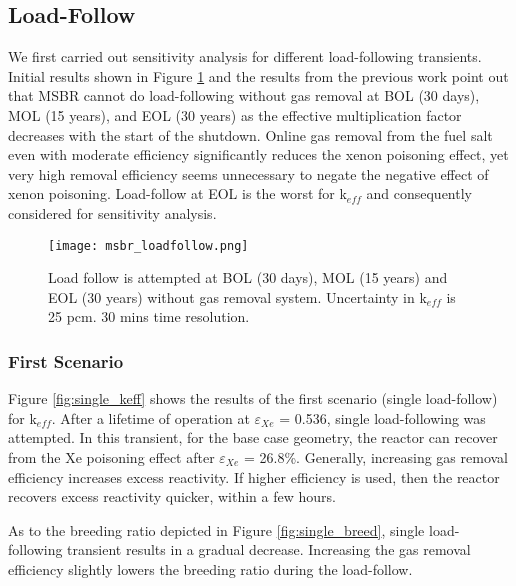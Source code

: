 \subsection{Load-Follow}

    We first carried out sensitivity analysis for different load-following 
    transients. Initial results shown in Figure \ref{fig:loadfollow} and the 
    results from the previous work \cite{rykhlevskii_fuel_2020} point out that 
    \gls{MSBR} cannot do load-following without gas removal at BOL (30 days), MOL (15 
    years), and EOL (30 years) as the effective multiplication factor decreases 
    with the start of the shutdown. Online gas removal from the fuel salt even 
    with moderate efficiency significantly reduces the xenon poisoning effect, 
    yet very high removal efficiency seems unnecessary to negate the negative 
    effect of xenon poisoning. Load-follow at EOL is the worst for k$_{eff}$ 
    and consequently considered for sensitivity analysis.

    \begin{figure}[h]
        \begin{center}
            \texttt{[image: msbr\_loadfollow.png]}
        \end{center}
        \caption{Load follow is attempted at BOL (30 days), MOL (15 years) and 
            EOL (30 years) without gas removal system. Uncertainty in k$_{eff}$ 
            is 25 pcm. 30 mins time resolution.}
        \label{fig:loadfollow}
    \end{figure}

\subsubsection{First Scenario}

    Figure \ref{fig:single_keff} shows the results of the first scenario 
    (single load-follow) for k$_{eff}$. After a lifetime of operation at 
    $\varepsilon$$_{Xe}$ = 0.536, single load-following was attempted. In this 
    transient, for the base case geometry, the reactor can recover from the Xe 
    poisoning effect after $\varepsilon$$_{Xe}$ = 26.8\%. Generally, increasing 
    gas removal efficiency increases excess reactivity. If higher efficiency is 
    used, then the reactor recovers excess reactivity quicker, within a few 
    hours.

    As to the breeding ratio depicted in Figure \ref{fig:single_breed}, single 
    load-following transient results in a gradual decrease. Increasing the gas 
    removal efficiency slightly lowers the breeding ratio during the 
    load-follow.

